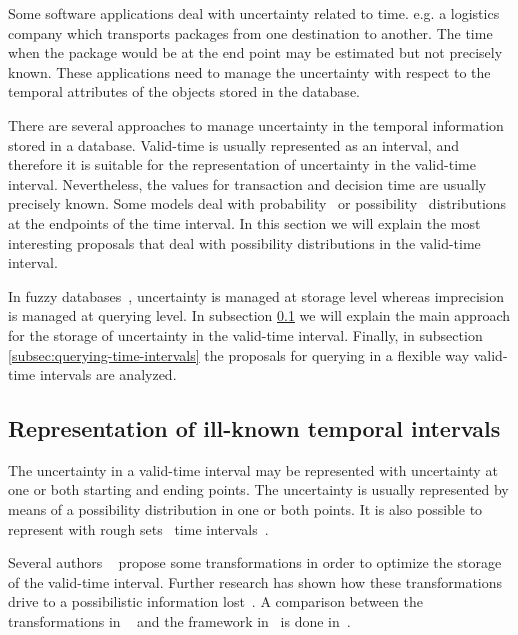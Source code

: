 %
%
Some software applications deal with uncertainty related to time. e.g. a logistics company which transports packages from one destination to another. The time when the package would be at the end point may be estimated but not precisely known. These applications need to manage the uncertainty with respect to the temporal attributes of the objects stored in the database.

There are several approaches to manage uncertainty in the temporal information stored in a database. Valid-time is usually represented as an interval, and therefore it is suitable for the representation of uncertainty in the valid-time interval. Nevertheless, the values for transaction and decision time are usually precisely known.
Some models deal with probability~\cite{Dekhtyar2001} or possibility~\cite{Dubois89} distributions at the endpoints of the time interval. In this section we will explain the most interesting proposals that deal with possibility distributions in the valid-time interval. %

In fuzzy databases~\cite{Galindo2006}, uncertainty is managed at storage level whereas imprecision is managed at querying level. In subsection \ref{subsec:representation-time-intervals} we will explain the main approach for the storage of uncertainty in the valid-time interval. Finally, in subsection \ref{subsec:querying-time-intervals} the proposals for querying in a flexible way valid-time intervals are analyzed.

\subsection{Representation of ill-known temporal intervals}
\label{subsec:representation-time-intervals}
The uncertainty in a valid-time interval may be represented with uncertainty at one or both starting and ending points. The uncertainty is usually represented by means of a possibility distribution in one or both points. It is also possible to represent with rough sets~\cite{Pawlak1995} time intervals~\cite{Qia09}.

Several authors ~\cite{garrido2009} propose some transformations in order to optimize the storage of the valid-time interval. Further research has shown how these transformations drive to a possibilistic information lost~\cite{Pon11}. A comparison between the transformations in ~\cite{garrido2009}  and the framework in~\cite{Pon11} is done in~\cite{pon12}. 

